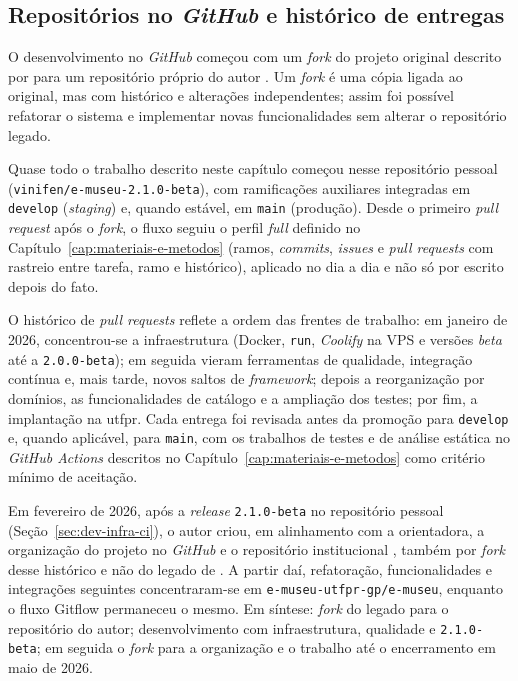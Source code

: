 \subsection{Repositórios no \textit{GitHub} e histórico de entregas}\label{sec:dev-repos-github}

O desenvolvimento no \textit{GitHub} começou com um \textit{fork} do projeto original descrito por  para um repositório próprio do autor \cite{emuseurepo}. Um \textit{fork} é uma cópia ligada ao original, mas com histórico e alterações independentes; assim foi possível refatorar o sistema e implementar novas funcionalidades sem alterar o repositório legado.

Quase todo o trabalho descrito neste capítulo começou nesse repositório pessoal (\texttt{vinifen/e-museu-2.1.0-beta}), com ramificações auxiliares integradas em \texttt{develop} (\textit{staging}) e, quando estável, em \texttt{main} (produção). Desde o primeiro \textit{pull request} após o \textit{fork}, o fluxo seguiu o perfil \textit{full} definido no Capítulo~\ref{cap:materiais-e-metodos} (ramos, \textit{commits}, \textit{issues} e \textit{pull requests} com rastreio entre tarefa, ramo e histórico), aplicado no dia a dia e não só por escrito depois do fato.

O histórico de \textit{pull requests} reflete a ordem das frentes de trabalho: em janeiro de 2026, concentrou-se a infraestrutura (Docker, \texttt{run}, \textit{Coolify} na VPS e versões \textit{beta} até a \texttt{2.0.0-beta}); em seguida vieram ferramentas de qualidade, integração contínua e, mais tarde, novos saltos de \textit{framework}; depois a reorganização por domínios, as funcionalidades de catálogo e a ampliação dos testes; por fim, a implantação na \acrshort{utfpr}. Cada entrega foi revisada antes da promoção para \texttt{develop} e, quando aplicável, para \texttt{main}, com os trabalhos de testes e de análise estática no \textit{GitHub Actions} descritos no Capítulo~\ref{cap:materiais-e-metodos} como critério mínimo de aceitação.

Em fevereiro de 2026, após a \textit{release} \texttt{2.1.0-beta} no repositório pessoal (Seção~\ref{sec:dev-infra-ci}), o autor criou, em alinhamento com a orientadora, a organização do projeto no \textit{GitHub} e o repositório institucional \cite{emuseuorgrepo}, também por \textit{fork} desse histórico e não do legado de . A partir daí, refatoração, funcionalidades e integrações seguintes concentraram-se em \texttt{e-museu-utfpr-gp/e-museu}, enquanto o fluxo Gitflow permaneceu o mesmo. Em síntese: \textit{fork} do legado para o repositório do autor; desenvolvimento com infraestrutura, qualidade e \texttt{2.1.0-beta}; em seguida o \textit{fork} para a organização e o trabalho até o encerramento em maio de 2026.

